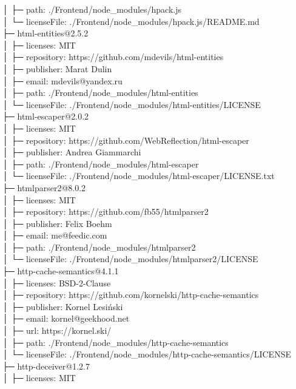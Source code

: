 │  ├─ path: ./Frontend/node\_modules/hpack.js\\
│  └─ licenseFile: ./Frontend/node\_modules/hpack.js/README.md\\
├─ html-entities@2.5.2\\
│  ├─ licenses: MIT\\
│  ├─ repository: https://github.com/mdevils/html-entities\\
│  ├─ publisher: Marat Dulin\\
│  ├─ email: mdevils@yandex.ru\\
│  ├─ path: ./Frontend/node\_modules/html-entities\\
│  └─ licenseFile: ./Frontend/node\_modules/html-entities/LICENSE\\
├─ html-escaper@2.0.2\\
│  ├─ licenses: MIT\\
│  ├─ repository: https://github.com/WebReflection/html-escaper\\
│  ├─ publisher: Andrea Giammarchi\\
│  ├─ path: ./Frontend/node\_modules/html-escaper\\
│  └─ licenseFile: ./Frontend/node\_modules/html-escaper/LICENSE.txt\\
├─ htmlparser2@8.0.2\\
│  ├─ licenses: MIT\\
│  ├─ repository: https://github.com/fb55/htmlparser2\\
│  ├─ publisher: Felix Boehm\\
│  ├─ email: me@feedic.com\\
│  ├─ path: ./Frontend/node\_modules/htmlparser2\\
│  └─ licenseFile: ./Frontend/node\_modules/htmlparser2/LICENSE\\
├─ http-cache-semantics@4.1.1\\
│  ├─ licenses: BSD-2-Clause\\
│  ├─ repository: https://github.com/kornelski/http-cache-semantics\\
│  ├─ publisher: Kornel Lesiński\\
│  ├─ email: kornel@geekhood.net\\
│  ├─ url: https://kornel.ski/\\
│  ├─ path: ./Frontend/node\_modules/http-cache-semantics\\
│  └─ licenseFile: ./Frontend/node\_modules/http-cache-semantics/LICENSE\\
├─ http-deceiver@1.2.7\\
│  ├─ licenses: MIT\\
